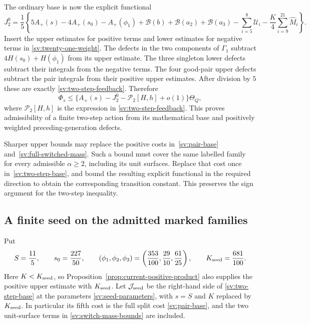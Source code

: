 The ordinary base is now the explicit functional
\begin{equation}\label{sv:two-step-base}
 J_2^0=\frac15\left\{
 5A_+(s)-4A_+(s_0)-A_+(\phi_1)
 +\mathcal B(b)+\mathcal B(a_2)+\mathcal B(a_3)
 -\sum_{i=5}^8\mathcal U_i
 -\frac K4\sum_{i=9}^{21}\widehat M_i\right\}.
\end{equation}
Insert the upper estimates for positive terms and lower estimates
for negative terms in \eqref{sv:twenty-one-weight}.
The defects in the two components of $\Gamma_1$ subtract
$4H(s_0)+H(\phi_1)$ from its upper estimate.  The three singleton
lower defects subtract their integrals from the negative terms.
The four good-pair upper defects subtract the pair integrals from
their positive upper estimates.  After division by $5$ these are
exactly \eqref{sv:two-step-feedback}.  Therefore
\begin{equation}\label{sv:two-step-admissibility}
 \Phi_s\le\{A_+(s)-J_2^0-\mathcal P_2[H,h]+o(1)\}\Theta_Q,
\end{equation}
where $\mathcal P_2[H,h]$ is the expression in
\eqref{sv:two-step-feedback}.  This proves admissibility of a
finite two-step action from its mathematical base and positively
weighted preceding-generation defects.

Sharper upper bounds may replace the positive costs
in~\eqref{sv:pair-base} and~\eqref{sv:full-switched-mass}.
Such a bound must cover the same labelled family for every admissible
$\alpha\ge2$, including its unit surfaces. Replace that cost once
in~\eqref{sv:two-step-base}, and bound the resulting explicit
functional in the required direction to obtain the corresponding transition
constant. This preserves the sign argument for the two-step
inequality.

\subsection{A finite seed on the admitted marked families}

Put
\begin{equation}\label{sv:seed-parameters}
 S=\frac{11}{5},\qquad s_0=\frac{227}{50},\qquad
 (\phi_1,\phi_2,\phi_3)
 =\left(\frac{353}{100},\frac{29}{10},\frac{61}{25}\right),
 \qquad K_{\rm seed}=\frac{681}{100}.
\end{equation}
Here $K<K_{\rm seed}$, so Proposition~\ref{prop:current-positive-product}
also supplies the positive upper estimate with $K_{\rm seed}$.
Let $\mathcal J_{\rm seed}$ be the right-hand side of
\eqref{sv:two-step-base} at the parameters
\eqref{sv:seed-parameters}, with $s=S$ and $K$ replaced by
$K_{\rm seed}$. In particular its fifth cost is the full split cost
\eqref{sv:pair-base}, and the two unit-surface terms in
\eqref{sv:switch-mass-bounds} are included.

